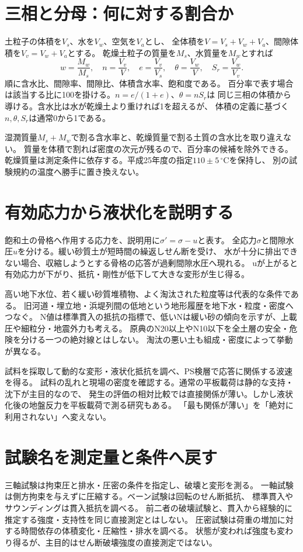 \section{三相と分母：何に対する割合か}\label{theory:engineering:phases}
土粒子の体積を\(V_s\)、水を\(V_w\)、空気を\(V_a\)とし、
全体積を\(V=V_s+V_w+V_a\)、間隙体積を\(V_v=V_w+V_a\)とする。
乾燥土粒子の質量を\(M_s\)、水質量を\(M_w\)とすれば
\[
 w=\frac{M_w}{M_s},\quad n=\frac{V_v}{V},\quad
 e=\frac{V_v}{V_s},\quad \theta=\frac{V_w}{V},\quad
 S_r=\frac{V_w}{V_v}.
\]
順に含水比、間隙率、間隙比、体積含水率、飽和度である。
百分率で表す場合は該当する比に100を掛ける。\(n=e/(1+e)\)、\(\theta=nS_r\)は
同じ三相の体積から導ける。含水比は水が乾燥土より重ければ1を超えるが、
体積の定義に基づく\(n,\theta,S_r\)は通常0から1である。\cite{eng52_soil_phases}

湿潤質量\(M_s+M_w\)で割る含水率と、乾燥質量で割る土質の含水比を取り違えない。
質量を体積で割れば密度の次元が残るので、百分率の候補を除外できる。
乾燥質量は測定条件に依存する。平成25年度の指定\(110\pm5\,^\circ\mathrm C\)を保持し、
別の試験規約の温度へ勝手に置き換えない。

\section{有効応力から液状化を説明する}\label{theory:engineering:liquefaction}
飽和土の骨格へ作用する応力を、説明用に\(\sigma'=\sigma-u\)と表す。
全応力\(\sigma\)と間隙水圧\(u\)を分ける。緩い砂質土が短時間の繰返しせん断を受け、
水が十分に排出できない場合、収縮しようとする骨格の応答が過剰間隙水圧へ現れる。
uが上がると有効応力が下がり、抵抗・剛性が低下して大きな変形が生じ得る。\cite{eng52_liquefaction}

高い地下水位、若く緩い砂質堆積物、よく淘汰された粒度等は代表的な条件である。
旧河道・埋立地・浜堤列間の低地という地形履歴を地下水・粒度・密度へつなぐ。
N値は標準貫入の抵抗の指標で、低いNは緩い砂の傾向を示すが、上載圧や細粒分・地震外力も考える。
原典のN20以上やN10以下を全土層の安全・危険を分ける一つの絶対線とはしない。
淘汰の悪い土も組成・密度によって挙動が異なる。\cite{eng52_liq_sorting}

試料を採取して動的な変形・液状化抵抗を調べ、PS検層で応答に関係する波速を得る。
試料の乱れと現場の密度を確認する。通常の平板載荷は静的な支持・沈下が主目的なので、
発生の評価の相対比較では直接関係が薄い。しかし液状化後の地盤反力を平板載荷で測る研究もある。
「最も関係が薄い」を「絶対に利用されない」へ変えない。\cite{eng52_plate_liq,geebec_ps}

\section{試験名を測定量と条件へ戻す}\label{theory:engineering:tests}
三軸試験は拘束圧と排水・圧密の条件を指定し、破壊と変形を測る。
一軸試験は側方拘束を与えずに圧縮する。ベーン試験は回転のせん断抵抗、
標準貫入やサウンディングは貫入抵抗を調べる。
前二者の破壊試験と、貫入から経験的に推定する強度・支持性を同じ直接測定とはしない。\cite{eng52_geotech_tests}
圧密試験は荷重の増加に対する時間依存の体積変化・圧縮性・排水を調べる。
状態が変われば強度も変わり得るが、主目的はせん断破壊強度の直接測定ではない。\cite{eng52_consolidation}


